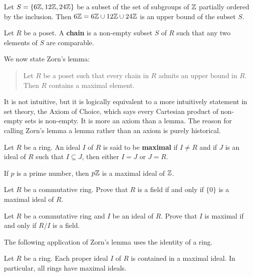 \begin{example}
    Let $S=\{6\mathbb{Z},12\mathbb{Z},24\mathbb{Z}\}$ be a subset of the set of subgroups of $\mathbb{Z}$ partially ordered by 
    the inclusion. Then 
    $6\mathbb{Z}=6\mathbb{Z}\cup 12\mathbb{Z}\cup 24\mathbb{Z}$ is an upper bound of the subset $S$. 
\end{example}

\begin{definition}
    Let $R$ be a poset. A \textbf{chain} is a non-empty subset $S$ of $R$ such that
    any two elements of $S$ are comparable. 
\end{definition}

We now state Zorn's lemma:

\begin{quote}
Let $R$ be a poset such that 
every chain in $R$ admits an upper bound in $R$. 
Then $R$ contains a maximal element. 
\end{quote}

It is not intuitive, but it is logically equivalent to a more 
intuitively statement in set theory, the Axiom of Choice, 
which says every Cartesian product of non-empty sets is non-empty. 
It is more an axiom than a lemma. 
The reason for calling Zorn’s lemma a lemma rather 
than an axiom is purely historical.

\begin{definition}
	Let $R$ be a ring. An ideal $I$ of $R$ is said to be \textbf{maximal}
	if $I\ne R$ and if $J$ is an ideal of $R$ such that $I\subseteq J$, then 
	either $I=J$ or $J=R$. 
\end{definition}

If $p$ is a prime number, then $p\mathbb{Z}$ is a maximal ideal of $\mathbb{Z}$.

\begin{exercise}
Let $R$ be a commutative ring. Prove that $R$ is a 
field if and only if $\{0\}$ is a maximal ideal of $R$. 	
\end{exercise}

\begin{exercise}
Let $R$ be a commutative ring and $I$ be an ideal of $R$. Prove that $I$ is maximal
if and only if $R/I$ is a field.  	
\end{exercise}

The following application of Zorn's lemma uses 
the identity of a ring. 

\begin{theorem}[Krull]
	Let $R$ be a ring. Each proper ideal $I$ of $R$ 
	is contained in a maximal ideal. 
	In particular, all rings have maximal ideals. 	
\end{theorem}

